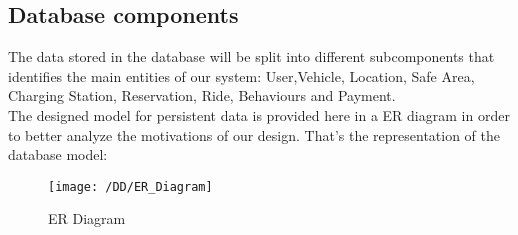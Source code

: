 \newpage
\subsection{Database components}
The data stored in the database will be split into different subcomponents that identifies the main entities of our system:
User,Vehicle, Location, Safe Area, Charging Station, Reservation, Ride, Behaviours and Payment.  
\\The designed model for persistent data is provided here in a ER diagram in order to better analyze the motivations of our design. That's the representation of the database model:
\begin{figure}[!ht]
  \centering
  \vspace{0.2cm}
  \texttt{[image: /DD/ER\_Diagram]}\\
  \vspace{0.4cm}
  \caption{ER Diagram} 
  \label{fig:ER_Diagram} 
\end{figure}


